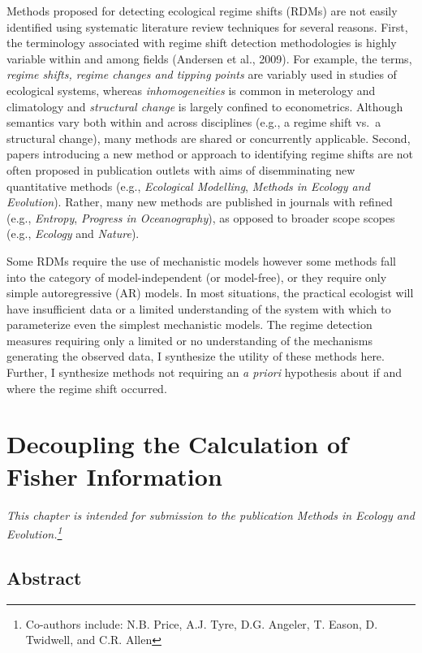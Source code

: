 \documentclass[12pt,twoside,openany]{reedthesis}
\begin{document}
Methods proposed for detecting ecological regime shifts (RDMs) are not easily identified using systematic literature review techniques for several reasons. First, the terminology associated with regime shift detection methodologies is highly variable within and among fields (Andersen et al., 2009). For example, the terms, \emph{regime shifts, regime changes and tipping points} are variably used in studies of ecological systems, whereas \emph{inhomogeneities} is common in meterology and climatology and \emph{structural change} is largely confined to econometrics. Although semantics vary both within and across disciplines (e.g., a regime shift vs.~a structural change), many methods are shared or concurrently applicable. Second, papers introducing a new method or approach to identifying regime shifts are not often proposed in publication outlets with aims of disemminating new quantitative methods (e.g., \emph{Ecological Modelling}, \emph{Methods in Ecology and Evolution}). Rather, many new methods are published in journals with refined (e.g., \emph{Entropy}, \emph{Progress in Oceanography}), as opposed to broader scope scopes (e.g., \emph{Ecology} and \emph{Nature}).

Some RDMs require the use of mechanistic models however some methods fall into the category of model-independent (or model-free), or they require only simple autoregressive (AR) models. In most situations, the practical ecologist will have insufficient data or a limited understanding of the system with which to parameterize even the simplest mechanistic models. The regime detection measures requiring only a limited or no understanding of the mechanisms generating the observed data, I synthesize the utility of these methods here. Further, I synthesize methods not requiring an \emph{a priori} hypothesis about if and where the regime shift occurred.

\hypertarget{fiGuide}{%
\chapter{Decoupling the Calculation of Fisher Information}\label{fiGuide}}

\emph{This chapter is intended for submission to the publication \emph{Methods in Ecology and Evolution}.\footnote{Co-authors include: N.B. Price, A.J. Tyre, D.G. Angeler, T. Eason, D. Twidwell, and C.R. Allen}}

\hypertarget{abstract-1}{%
\section{Abstract}\label{abstract-1}}
\end{document}
